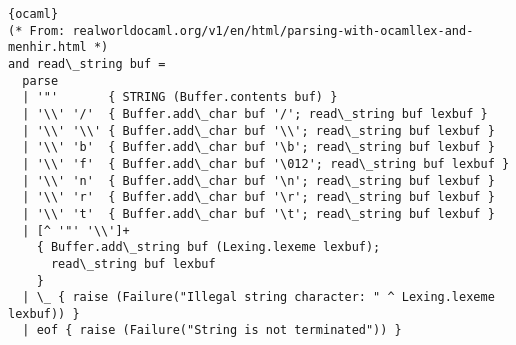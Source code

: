 \begin{lstlisting}{ocaml}
(* From: realworldocaml.org/v1/en/html/parsing-with-ocamllex-and-menhir.html *)
and read\_string buf =
  parse
  | '"'       { STRING (Buffer.contents buf) }
  | '\\' '/'  { Buffer.add\_char buf '/'; read\_string buf lexbuf }
  | '\\' '\\' { Buffer.add\_char buf '\\'; read\_string buf lexbuf }
  | '\\' 'b'  { Buffer.add\_char buf '\b'; read\_string buf lexbuf }
  | '\\' 'f'  { Buffer.add\_char buf '\012'; read\_string buf lexbuf }
  | '\\' 'n'  { Buffer.add\_char buf '\n'; read\_string buf lexbuf }
  | '\\' 'r'  { Buffer.add\_char buf '\r'; read\_string buf lexbuf }
  | '\\' 't'  { Buffer.add\_char buf '\t'; read\_string buf lexbuf }
  | [^ '"' '\\']+
    { Buffer.add\_string buf (Lexing.lexeme lexbuf);
      read\_string buf lexbuf
    }
  | \_ { raise (Failure("Illegal string character: " ^ Lexing.lexeme lexbuf)) }
  | eof { raise (Failure("String is not terminated")) }
\end{lstlisting}
